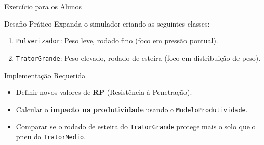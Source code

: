 \documentclass[9pt]{beamer}
\begin{document}
\begin{frame}{ Exercício para os Alunos}
    \begin{alertblock}{Desafio Prático}
        Expanda o simulador criando as seguintes classes:
        \begin{enumerate}
            \item \texttt{Pulverizador}: Peso leve, rodado fino (foco em pressão pontual).
            \item \texttt{TratorGrande}: Peso elevado, rodado de esteira (foco em distribuição de peso).
        \end{enumerate}
    \end{alertblock}
    
    \begin{block}{Implementação Requerida}
        \begin{itemize}
            \item Definir novos valores de \textbf{RP} (Resistência à Penetração).
            \item Calcular o \textbf{impacto na produtividade} usando o \texttt{ModeloProdutividade}.
            \item Comparar se o rodado de esteira do \texttt{TratorGrande} protege mais o solo que o pneu do \texttt{TratorMedio}.
        \end{itemize}
    \end{block}
\end{frame}
\end{document}
